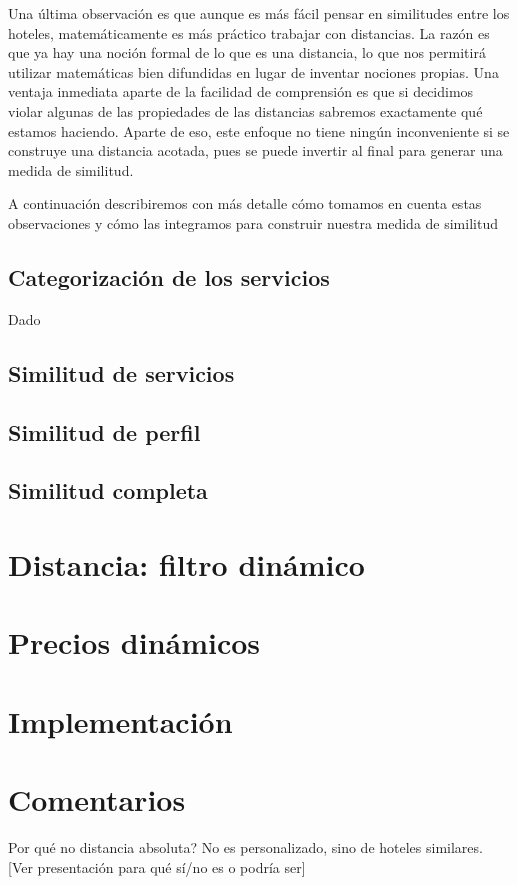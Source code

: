 \documentclass[12pt]{report}
\begin{document}
Una última observación es que aunque es más fácil pensar en similitudes entre los hoteles, matemáticamente es más práctico trabajar con distancias. La razón es que ya hay una noción formal de lo que es una distancia, lo que nos permitirá utilizar matemáticas bien difundidas en lugar de inventar nociones propias. Una ventaja inmediata aparte de la facilidad de comprensión es que si decidimos violar algunas de las propiedades de las distancias sabremos exactamente qué estamos haciendo. Aparte de eso, este enfoque no tiene ningún inconveniente si se construye una distancia acotada, pues se puede invertir al final para generar una medida de similitud.

A continuación describiremos con más detalle cómo tomamos en cuenta estas observaciones y cómo las integramos para construir nuestra medida de similitud

\subsection*{Categorización de los servicios}

Dado 

\subsection*{Similitud de servicios}
\subsection*{Similitud de perfil}
\subsection*{Similitud completa}
\section{Distancia: filtro dinámico}
\section{Precios dinámicos}
\section{Implementación}
\section{Comentarios}
Por qué no distancia absoluta?
No es personalizado, sino de hoteles similares.
[Ver presentación para qué sí/no es o podría ser]
\end{document}
